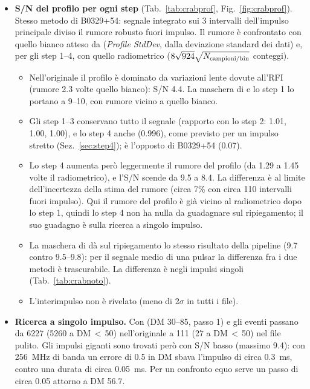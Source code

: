 \begin{itemize}
    armoniche trova un'armonica del ripiegamento. Senza lo step 2 una ricerca in periodo si sarebbe agganciata all'RFI.
  \item \textbf{S/N del profilo per ogni step} (Tab.~\ref{tab:crabprof}, Fig.~\ref{fig:crabprof}). Stesso metodo di
    B0329+54: segnale integrato sui 3 intervalli dell'impulso principale diviso il rumore robusto fuori impulso. Il
    rumore è confrontato con quello bianco atteso da  (\emph{Profile StdDev}, dalla deviazione standard
    dei dati) e, per gli step 1--4, con quello radiometrico ($8\sqrt{924}\sqrt{N_{\rm campioni/bin}}$ conteggi).
    \begin{itemize}
      \item Nell'originale il profilo è dominato da variazioni lente dovute all'RFI (rumore 2.3 volte quello bianco):
        S/N 4.4. La maschera di  e lo step 1 lo portano a 9--10, con rumore vicino a quello bianco.
      \item Gli step 1--3 conservano tutto il segnale (rapporto con lo step 2: 1.01, 1.00, 1.00), e lo step 4 anche
        (0.996), come previsto per un impulso stretto (Sez.~\ref{sec:step4}); è l'opposto di B0329+54 (0.07).
      \item Lo step 4 aumenta però leggermente il rumore del profilo (da 1.29 a 1.45 volte il radiometrico), e l'S/N
        scende da 9.5 a 8.4. La differenza è al limite dell'incertezza della stima del rumore (circa 7\% con circa
        110 intervalli fuori impulso). Qui il rumore del profilo è già vicino al radiometrico dopo lo step 1, quindi lo
        step 4 non ha nulla da guadagnare sul ripiegamento; il suo guadagno è sulla ricerca a singolo impulso.
      \item La maschera di  dà sul ripiegamento lo stesso risultato della pipeline (9.7 contro 9.5--9.8):
        per il segnale medio di una pulsar la differenza fra i due metodi è trascurabile. La differenza è negli impulsi
        singoli (Tab.~\ref{tab:crabnoto}).
      \item L'interimpulso non è rivelato (meno di 2$\sigma$ in tutti i file).
    \end{itemize}
  \item \textbf{Ricerca a singolo impulso.} Con  (DM 30--85, passo 1) e 
    gli eventi passano da 6227 (5260 a DM\,$<$\,50) nell'originale a 111 (27 a DM\,$<$\,50) nel file pulito. Gli
    impulsi giganti sono trovati però con S/N basso (massimo 9.4): con \SI{256}{\mega\hertz} di banda un errore di 0.5
    in DM sbava l'impulso di circa \SI{0.3}{\milli\second}, contro una durata di circa \SI{0.05}{\milli\second}. Per un
    confronto equo serve un passo di circa 0.05 attorno a DM 56.7.
\end{itemize}
\fussy


